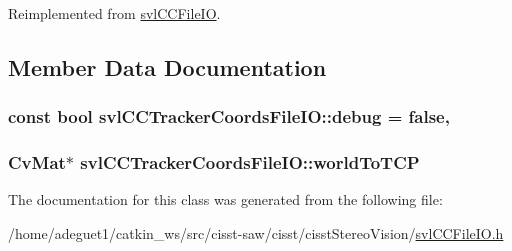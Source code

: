 Reimplemented from \hyperlink{classsvl_c_c_file_i_o_ab98a5780429fa2a83ffd118c00cf4d27}{svl\-C\-C\-File\-I\-O}.



\subsection{Member Data Documentation}
\hypertarget{classsvl_c_c_tracker_coords_file_i_o_aa792add13a0e86c73730b6f090dda22e}{
\subsubsection[{debug}]{\setlength{\rightskip}{0pt plus 5cm}const bool svl\-C\-C\-Tracker\-Coords\-File\-I\-O\-::debug = false\hspace{0.3cm}{\ttfamily [static]}, {\ttfamily [protected]}}}\label{classsvl_c_c_tracker_coords_file_i_o_aa792add13a0e86c73730b6f090dda22e}
\hypertarget{classsvl_c_c_tracker_coords_file_i_o_a52c6b69d40df95c9e2a2028415c3ac5f}{
\subsubsection[{world\-To\-T\-C\-P}]{\setlength{\rightskip}{0pt plus 5cm}Cv\-Mat$\ast$ svl\-C\-C\-Tracker\-Coords\-File\-I\-O\-::world\-To\-T\-C\-P}}\label{classsvl_c_c_tracker_coords_file_i_o_a52c6b69d40df95c9e2a2028415c3ac5f}


The documentation for this class was generated from the following file\-:\begin{DoxyCompactItemize}
\item 
/home/adeguet1/catkin\-\_\-ws/src/cisst-\/saw/cisst/cisst\-Stereo\-Vision/\hyperlink{svl_c_c_file_i_o_8h}{svl\-C\-C\-File\-I\-O.\-h}\end{DoxyCompactItemize}

